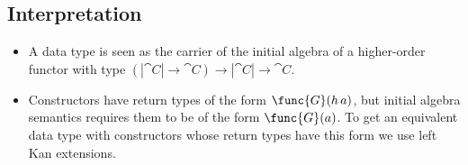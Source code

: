 \subsection{Interpretation}
\label{subsec:interpretation}
\begin{itemize}
\item A data type is seen as the carrier of the initial algebra of a
higher-order functor with type $(|\cat{C}| \to \cat{C}) \to |\cat{C}|
\to \cat{C}$.
\item Constructors have return types of the form $\func{G} (h\,a)$,
but initial algebra semantics requires them to be of the form
$\func{G}(a)$. To get an equivalent data type with constructors whose
return types have this form we use left Kan extensions.
\end{itemize}
